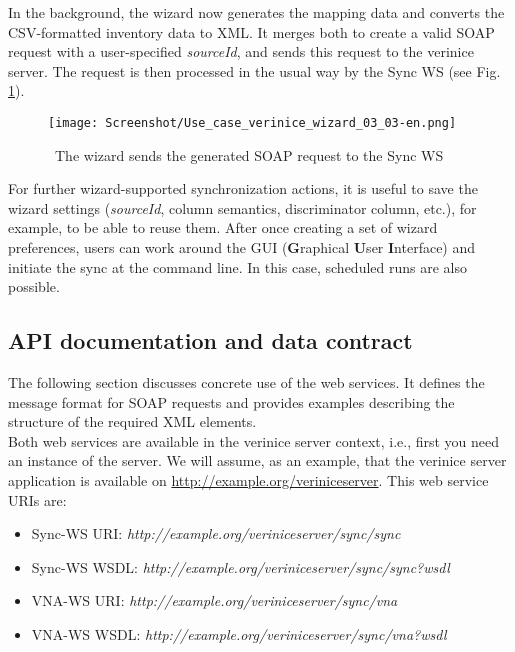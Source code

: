 \documentclass[a4paper,10pt]{book}
\begin{document}
\newline
In the background, the wizard now generates the mapping data and
converts the CSV-formatted inventory data to XML. It merges both to
create a valid SOAP request with a user-specified {\em sourceId}, and
sends this request to the verinice server. The request is then
processed in the usual way by the Sync WS (see
Fig. \ref{fig:soap-request}).
\newline
\begin{figure}[htb!]
  \centering
  \texttt{[image: Screenshot/Use\_case\_verinice\_wizard\_03\_03-en.png]}
  \caption{\label{fig:soap-request} \ The wizard sends the generated SOAP request to the Sync WS}
\end{figure}
\newline
For further wizard-supported synchronization actions, it is useful to save the wizard settings ({\em sourceId},
column semantics, discriminator column, etc.), for example, to be able to reuse them. After once creating a set
of wizard preferences, users can work around the GUI (\textbf{G}raphical \textbf{U}ser \textbf{I}nterface) and
initiate the sync at the command line. In this case, scheduled runs are also possible.

\subsection{ API documentation and data contract} \label{API documentation and data contract}
The following section discusses concrete use of the web services. It defines the message format for SOAP requests and
provides examples describing the structure of the required XML elements.
\newline\\
Both web services are available in the verinice server context, i.e., first you need an instance of the server. We will assume, as an
example, that the verinice server application is available on
\newline
\href{http://example.org/veriniceserver}{http://example.org/veriniceserver}.
\newline
This web service URIs are:
\begin{itemize}
 \item Sync-WS URI: \textit{http://example.org/veriniceserver/sync/sync}
 \item Sync-WS WSDL: \textit{http://example.org/veriniceserver/sync/sync?wsdl}
 \item VNA-WS URI: \textit{http://example.org/veriniceserver/sync/vna}
 \item VNA-WS WSDL: \textit{http://example.org/veriniceserver/sync/vna?wsdl}
\end{itemize}
\end{document}
